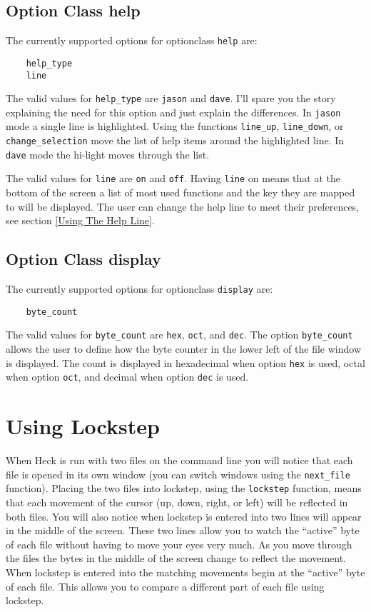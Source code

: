 \documentclass[12pt]{article}
\begin{document}
\subsection{Option Class help}
The currently supported options for optionclass \verb#help# are:
\begin{verbatim}
    help_type
    line
\end{verbatim}

The valid values for \verb#help_type# are \verb#jason# and \verb#dave#.  I'll
spare you the story explaining the need for this option and just explain the 
differences.  In \verb#jason# mode a single line is highlighted.  Using the 
functions \verb#line_up#, \verb#line_down#, or \verb#change_selection# move 
the list of help items around the highlighted line.  In \verb#dave# mode the 
hi-light moves through the list.

The valid values for \verb#line# are \verb#on# and \verb#off#.  Having 
\verb#line# on means that at the bottom of the screen a list of most used
functions and the key they are mapped to will be displayed.  The user can
change the help line to meet their preferences, see section \ref{Using The Help Line}.

\subsection{Option Class display}
The currently supported options for optionclass \verb#display# are:
\begin{verbatim}
    byte_count
\end{verbatim}

The valid values for \verb#byte_count# are \verb#hex#, \verb#oct#, and
\verb#dec#.  The option \verb#byte_count# allows the user to define how the
byte counter in the lower left of the file window is displayed.  The count is
displayed in hexadecimal when option \verb#hex# is used, octal when option 
\verb#oct#, and decimal when option \verb#dec# is used.

\section{Using Lockstep}
\label{Lockstep}
When Heck is run with two files on the command line
you will notice that each file is opened in its own window (you can switch
windows using the \verb#next_file# function).  Placing the two files into 
lockstep, using the  \verb#lockstep# function, means that each movement
of the cursor (up, down, right, or left) will be reflected in both files.
You will also notice when lockstep is entered into two lines will appear
in the middle of the screen.  These two lines allow you to watch the ``active''
byte of each file without having to move your eyes very much.  As you move 
through the files the bytes in the middle of the screen change to reflect
the movement.  When lockstep is entered into the matching movements begin
at the ``active'' byte of each file.  This allows you to compare a different
part of each file using lockstep.
\end{document}
